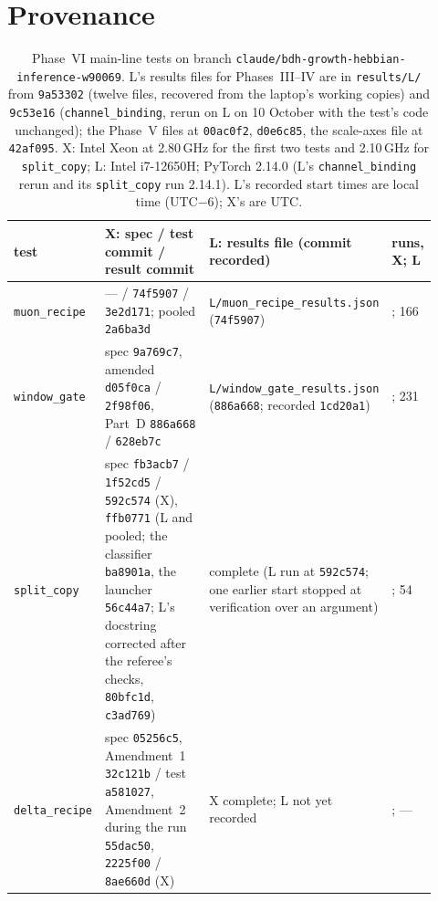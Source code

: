 \documentclass[11pt]{article}
\begin{document}
\appendix
\section{Provenance}
\label{app:prov}

\begin{table}[H]
\centering
\footnotesize
\begin{tabular}{@{}>{\raggedright\arraybackslash}p{0.15\linewidth}>{\raggedright\arraybackslash}p{0.4\linewidth}>{\raggedright\arraybackslash}p{0.28\linewidth}>{\raggedright\arraybackslash}p{0.09\linewidth}@{}}
\toprule
test & X: spec / test commit / result commit & L: results file (commit recorded) & runs, X; L\\
\midrule
\texttt{muon\_recipe} & --- / \texttt{74f5907} / \texttt{3e2d171}; pooled \texttt{2a6ba3d} & \texttt{L/muon\_recipe\_results.json} (\texttt{74f5907}) & 156; 166\\
\texttt{window\_gate} & spec \texttt{9a769c7}, amended \texttt{d05f0ca} / \texttt{2f98f06}, Part~D \texttt{886a668} / \texttt{628eb7c} & \texttt{L/window\_gate\_results.json} (\texttt{886a668}; recorded \texttt{1cd20a1}) & 231; 231\\
\texttt{split\_copy} & spec \texttt{fb3acb7} / \texttt{1f52cd5} / \texttt{592c574} (X), \texttt{ffb0771} (L and pooled; the classifier \texttt{ba8901a}, the launcher \texttt{56c44a7}; L's docstring corrected after the referee's checks, \texttt{80bfc1d}, \texttt{c3ad769}) & complete (L run at \texttt{592c574}; one earlier start stopped at verification over an argument) & 54; 54\\
\texttt{delta\_recipe} & spec \texttt{05256c5}, Amendment~1 \texttt{32c121b} / test \texttt{a581027}, Amendment~2 during the run \texttt{55dac50}, \texttt{2225f00} / \texttt{8ae660d} (X) & X complete; L not yet recorded & 84; ---\\
\bottomrule
\end{tabular}
\caption{Phase~VI main-line tests on branch \texttt{claude/bdh-growth-hebbian-inference-w90069}. L's results files for Phases~III--IV are in \texttt{results/L/} from \texttt{9a53302} (twelve files, recovered from the laptop's working copies) and \texttt{9c53e16} (\texttt{channel\_binding}, rerun on L on 10 October with the test's code unchanged); the Phase~V files at \texttt{00ac0f2}, \texttt{d0e6c85}, the scale-axes file at \texttt{42af095}. X: Intel Xeon at 2.80\,GHz for the first two tests and 2.10\,GHz for \texttt{split\_copy}; L: Intel i7-12650H; PyTorch 2.14.0 (L's \texttt{channel\_binding} rerun and its \texttt{split\_copy} run 2.14.1). L's recorded start times are local time (UTC$-$6); X's are UTC.}
\label{tab:prov}
\end{table}
\end{document}
